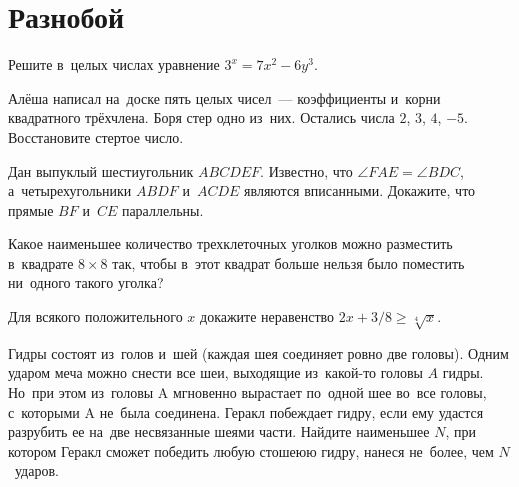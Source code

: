 
\section*{Разнобой}


\begin{problems}

\item
Решите в~целых числах уравнение $3^x = 7 x^2 - 6 y^3$.

\item
Алёша написал на~доске пять целых чисел~--- коэффициенты и~корни квадратного
трёхчлена.
Боря стер одно из~них.
Остались числа $2$, $3$, $4$, $-5$.
Восстановите стертое число.

\item
Дан выпуклый шестиугольник $ABCDEF$.
Известно, что $\angle FAE = \angle BDC$, а~четырехугольники $ABDF$ и~$ACDE$
являются вписанными.
Докажите, что прямые $BF$ и~$CE$ параллельны.

\item
Какое наименьшее количество трехклеточных уголков можно разместить в~квадрате
$8 \times 8$ так, чтобы в~этот квадрат больше нельзя было поместить ни~одного
такого уголка?

\item
Для всякого положительного $x$ докажите неравенство
$2 x + 3 / 8 \geq \sqrt[4]{x}$.

\item
Гидры состоят из~голов и~шей (каждая шея соединяет ровно две головы).
Одним ударом меча можно снести все шеи, выходящие из~какой-то головы $A$ гидры.
Но~при этом из~головы A мгновенно вырастает по~одной шее во~все головы,
с~которыми A не~была соединена.
Геракл побеждает гидру, если ему удастся разрубить ее на~две несвязанные шеями
части.
Найдите наименьшее $N$, при котором Геракл сможет победить любую стошеюю гидру,
нанеся не~более, чем $N$~ударов.

\end{problems}

